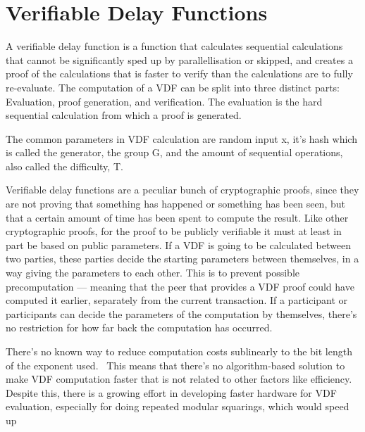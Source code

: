 \chapter{Verifiable Delay Functions}
\label{Verifiable Delay Functions}

A verifiable delay function is a function that calculates sequential calculations that cannot be significantly sped up by parallellisation or skipped, and creates a proof of the calculations that is faster to verify than the calculations are to fully re-evaluate. The computation of a VDF can be split into three distinct parts: Evaluation, proof generation, and verification. The evaluation is the hard sequential calculation from which a proof is generated.  

The common parameters in VDF calculation are random input x, it's hash which is called the generator, the group G, and the amount of sequential operations, also called the difficulty, T.

Verifiable delay functions are a peculiar bunch of cryptographic proofs, since they are not proving that something has happened or something has been seen, but that a certain amount of time has been spent to compute the result. Like other cryptographic proofs, for the proof to be publicly verifiable it must at least in part be based on public parameters. If a VDF is going to be calculated between two parties, these parties decide the starting parameters between themselves, in a way giving the parameters to each other. This is to prevent possible precomputation --- meaning that the peer that provides a VDF proof could have computed it earlier, separately from the current transaction. If a participant or participants can decide the parameters of the computation by themselves, there's no restriction for how far back the computation has occurred.

There's no known way to reduce computation costs sublinearly to the bit length of the exponent used.~\cite{Boneh2018-sm} This means that there's no algorithm-based solution to make VDF computation faster that is not related to other factors like efficiency. Despite this, there is a growing effort in developing faster hardware for VDF evaluation, especially for doing repeated modular squarings, which would speed up 

